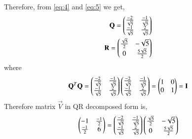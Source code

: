 \documentclass[journal,12pt,twocolumn]{IEEEtran}
\begin{document}
Therefore, from \eqref{eq:4} and \eqref{eq:5} we get,
\begin{align}
\vec{Q}= \myvec{\frac{-2}{\sqrt{5}}&\frac{-1}{\sqrt{5}}\\\frac{-1}{\sqrt{5}}&\frac{2}{\sqrt{5}}}\\
\Vec{R}=\myvec{\frac{\sqrt{5}}{2}&-\sqrt{5}\\0&\frac{5\sqrt{5}}{2}}
\end{align}
where
\begin{align}
    \vec{Q}^T\vec{Q}=\myvec{\frac{-2}{\sqrt{5}}&\frac{-1}{\sqrt{5}}\\\frac{-1}{\sqrt{5}}&\frac{2}{\sqrt{5}}}\myvec{\frac{-2}{\sqrt{5}}&\frac{-1}{\sqrt{5}}\\\frac{-1}{\sqrt{5}}&\frac{2}{\sqrt{5}}}   =\myvec{1&0\\0&1}=\Vec{I}
\end{align}
Therefore matrix $\vec{V}$ in QR decomposed form is,
\begin{align}
\begin{pmatrix}-1&\frac{-1}{2}\\\frac{-1}{2}&6\end{pmatrix}=\begin{pmatrix}\frac{-2}{\sqrt{5}}&\frac{-1}{\sqrt{5}}\\\frac{-1}{\sqrt{5}}&\frac{2}{\sqrt{5}}\end{pmatrix}\begin{pmatrix}\frac{\sqrt{5}}{2}&-\sqrt{5}\\0&\frac{5\sqrt{5}}{2}\end{pmatrix}
\end{align}
\end{document}

